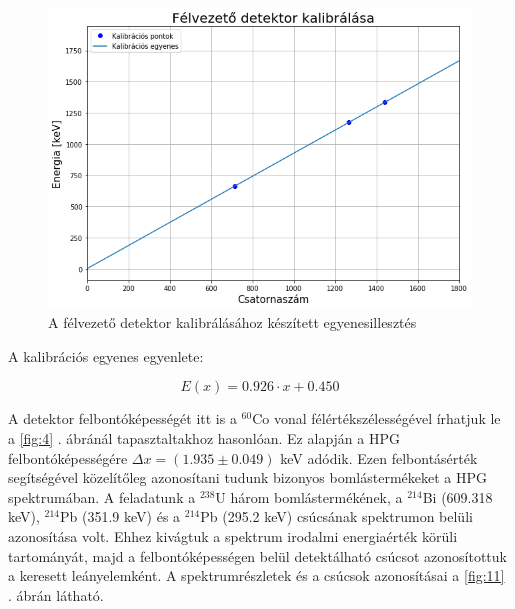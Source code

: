 \documentclass[12pt,a4paper]{article}
\begin{document}
\begin{figure}[!h]
\centering
\includegraphics[scale=0.60]{HPG_kalib}
\caption{A félvezető detektor kalibrálásához készített egyenesillesztés}
\label{fig:10}
\end{figure}

A kalibrációs egyenes egyenlete:

$$E(x)=0.926 \cdot x + 0.450$$

A detektor felbontóképességét itt is a $^{60}$Co vonal félértékszélességével írhatjuk le a \ref{fig:4} . ábránál tapasztaltakhoz hasonlóan. Ez alapján a HPG felbontóképességére $\Delta x = (1.935 \pm 0.049)$ keV adódik. Ezen felbontásérték segítségével közelítőleg azonosítani tudunk bizonyos bomlástermékeket a HPG spektrumában. A feladatunk a $^{238}$U három bomlástermékének, a $^{214}$Bi (609.318 keV), $^{214}$Pb (351.9 keV) és a $^{214}$Pb (295.2 keV) csúcsának spektrumon belüli azonosítása volt. Ehhez kivágtuk a spektrum irodalmi energiaérték körüli tartományát, majd a felbontóképességen belül detektálható csúcsot azonosítottuk a keresett leányelemként. A spektrumrészletek és a csúcsok azonosításai a \ref{fig:11} . ábrán látható.
\newpage
\end{document}
